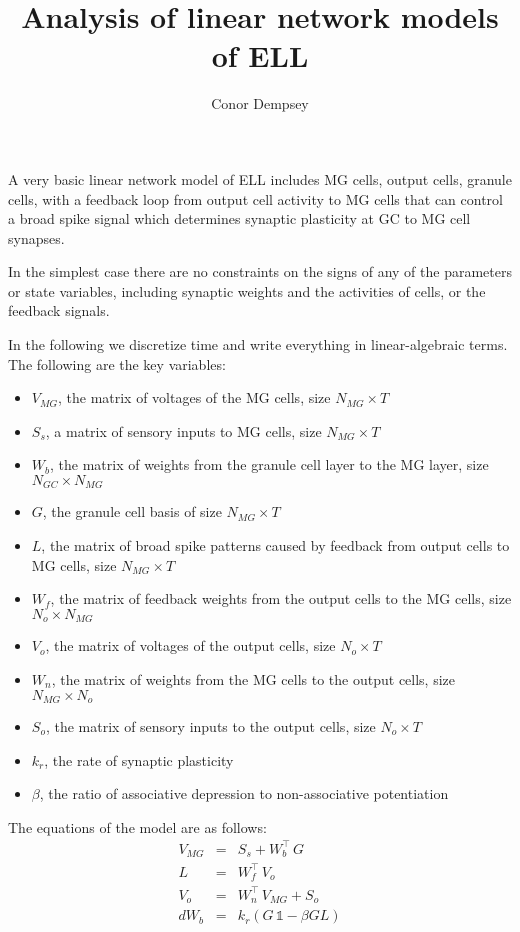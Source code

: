 \documentclass[11pt]{article}
\title{Analysis of linear network models of ELL}
\author{Conor Dempsey}
\begin{document}
\maketitle

A very basic linear network model of ELL includes MG cells, output cells, granule cells, with a feedback loop from output cell activity to MG cells that can control a broad spike signal which determines synaptic plasticity at GC to MG cell synapses.

In the simplest case there are no constraints on the signs of any of the parameters or state variables, including synaptic weights and the activities of cells, or the feedback signals.

In the following we discretize time and write everything in linear-algebraic terms. The following are the key variables:
\begin{itemize}
	\item $V_{MG}$, the matrix of voltages of the MG cells, size $N_{MG} \times T$
	\item $S_s$, a matrix of sensory inputs to MG cells, size $N_{MG} \times T$
	\item $W_b$, the matrix of weights from the granule cell layer to the MG layer, size $N_{GC} \times N_{MG}$
	\item $G$, the granule cell basis of size $N_{MG} \times T$
	\item $L$, the matrix of broad spike patterns caused by feedback from output cells to MG cells, size $N_{MG} \times T$
	\item $W_f$, the matrix of feedback weights from the output cells to the MG cells, size $N_o \times N_{MG}$
	\item $V_o$, the matrix of voltages of the output cells, size $N_o \times T$
	\item $W_n$, the matrix of weights from the MG cells to the output cells, size $N_{MG} \times N_o$
	\item $S_o$, the matrix of sensory inputs to the output cells, size $N_o \times T$
	\item $k_r$, the rate of synaptic plasticity
	\item $\beta$, the ratio of associative depression to non-associative potentiation
\end{itemize}

The equations of the model are as follows:
\begin{eqnarray*}
		V_{MG} &=& S_s + W_b^\intercal \, G \\
		L &=& W_f^\intercal \,V_o \\
		V_o &=& W_n^\intercal \,V_{MG} + S_o \\
		dW_b &=& k_r \left( G\,\mathds{1} - \beta GL \right )
\end{eqnarray*}
\end{document}
